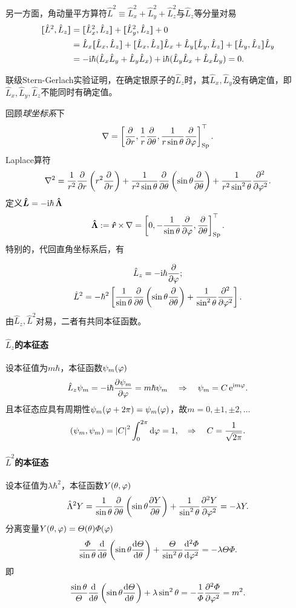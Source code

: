 另一方面，角动量平方算符$\hat L^2\equiv\hat L_x^2+\hat L_y^2+\hat L_z^2$与$\hat L_z$等分量对易
\begin{align}\notag
	\cmm{L^2}{L_z}&=\cmm{L^2_x}{L_z}+\cmm{L^2_y}{L_z}+0\\\notag
	&=\hat L_x\cmm{L_x}{L_z}+\cmm{L_x}{L_z}\hat L_x+\hat L_y\cmm{L_y}{L_z}+\cmm{L_y}{L_z}\hat L_y\\
	&=-\i\hbar(\hat L_x\hat L_y+\hat L_y\hat L_x)+\i\hbar(\hat L_y\hat L_x+\hat L_x\hat L_y)=0.
\end{align}

联级Stern-Gerlach实验证明，在确定银原子的$\hat L_z$时，其$\hat L_x,\hat L_y$没有确定值，即$\hat L_x,\hat L_y,\hat L_z$不能同时有确定值。

回顾\textit{球坐标系}下
\[
	\nabla=\fkh{\pp r,\frac1r\pp\ct,\frac1{r\sin\ct}\pp\vf}\tp_\mathrm{Sp}.
\]
Laplace算符
\[
	\nabla^2=\frac1{r^2}\pp r\kh{r^2\pp r}+\frac1{r^2\sin\theta}\pp\theta\kh{\sin\theta\pp\theta}+\frac1{r^2\sin^2\theta}\pp[2]\vf.
\]
定义$\bm{\hat L}\!\mathop{}=-\mathrm{i}\hbar\,\bm{\hat \Lambda}\!\mathop{}$
\[
	\qo\Lambda:=\qo r\times\,\nabla=\fkh{0,-\frac1{\sin\theta}\pp\vf,\pp\theta}\tp_\mathrm{Sp}.
\]
特别的，代回直角坐标系后，有
\iffalse
	\begin{align*}
		\hat L_x & =\i\hbar\kh{+\sin\vf\pp\ct+\cot\ct\cos\vf\pp\vf} \\
		\hat L_y & =\i\hbar\kh{-\cos\vf\pp\ct+\cot\ct\sin\vf\pp\vf} \\
		\hat L_z & =-\i\hbar\pp\vf.
	\end{align*}
\fi
\begin{gather}
	\hat L_z=-\i\hbar\pp\vf;\\
	\hat L^2=-\hbar^2\fkh{\frac1{\sin\theta}\pp\theta\kh{\sin\theta\pp\theta}+\frac1{\sin^2\ct}\pp[2]\vf}.
\end{gather}
由$\hat L_z,\hat L^2$对易，二者有共同本征函数。
\paragraph*{$\hat L_z$的本征态}设本征值为$m\hbar$，本征函数$\psi_m(\varphi)$
\[
	\hat L_z\psi_m=-\mathrm{i}\hbar\frac{\partial^{\;\!\!}\psi_m}{\partial \varphi^{\;\!\!}}=m\hbar\psi_m\quad\Rightarrow\quad\psi_m=C\mathop{}\!\mathrm{e}^{\mathrm{i} m\varphi}.
\]
且本征态应具有周期性$\psi_m(\varphi+2\pi)=\psi_m(\varphi)$，故$m=0,\pm 1,\pm 2,\ldots$
\[
	(\psi_m,\psi_m)=\left\lvert C\right\rvert^2\int_0^{2\pi}\mathop{}\!\mathrm{d}\varphi=1,\quad\Rightarrow\quad C=\frac1{\sqrt{2\pi}}.
\]
\paragraph*{$\hat L^2$的本征态}设本征值为$\lambda\hbar^2$，本征函数$Y(\theta,\varphi)$
\[
	\hat\Lambda^2Y=\frac1{\sin\theta}\pp\theta\kh{\sin\theta\pv Y\theta}+\frac1{\sin^2\ct}\pv[2]Y\vf=-\lambda Y.
\]
分离变量$Y(\theta,\varphi)=\varTheta(\theta)\varPhi(\varphi)$
\[
	\frac\vF{\sin\ct}\dd\ct\kh{\sin\ct\dv\vC\ct}+\frac\vC{\sin^2\ct}\dv[2]\vF\vf=-\lambda\vC\vF.
\]
即
\[
	\frac{\sin\theta}\vC\dd\ct\kh{\sin\theta\dv\vC\ct}+\lambda\sin^2\ct=-\frac1\vF\pv[2]\vF\vf=m^2.
\]

